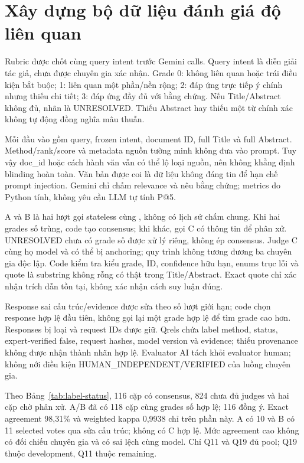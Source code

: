 \section{Xây dựng bộ dữ liệu đánh giá độ liên quan}
Rubric được chốt cùng query intent trước Gemini calls. Query intent là diễn giải tác giả, chưa được chuyên gia xác nhận. Grade 0: không liên quan hoặc trái điều kiện bắt buộc; 1: liên quan một phần/nền rộng; 2: đáp ứng trực tiếp ý chính nhưng thiếu chi tiết; 3: đáp ứng đầy đủ với bằng chứng. Nếu Title/Abstract không đủ, nhãn là UNRESOLVED. Thiếu Abstract hay thiếu một từ chính xác không tự động đồng nghĩa mâu thuẫn.

Mỗi đầu vào gồm query, frozen intent, document ID, full Title và full Abstract. Method/rank/score và metadata nguồn tường minh không đưa vào prompt. Tuy vậy doc\_id hoặc cách hành văn vẫn có thể lộ loại nguồn, nên không khẳng định blinding hoàn toàn. Văn bản được coi là dữ liệu không đáng tin để hạn chế prompt injection. Gemini chỉ chấm relevance và nêu bằng chứng; metrics do Python tính, không yêu cầu LLM tự tính P@5.

A và B là hai lượt gọi stateless cùng , không có lịch sử chấm chung. Khi hai grades số trùng, code tạo consensus; khi khác, gọi C có thông tin để phân xử. UNRESOLVED chưa có grade số được xử lý riêng, không ép consensus. Judge C cùng họ model và có thể bị anchoring; quy trình không tương đương ba chuyên gia độc lập. Code kiểm tra kiểu grade, ID, confidence hữu hạn, enums trục lỗi và quote là substring không rỗng có thật trong Title/Abstract. Exact quote chỉ xác nhận trích dẫn tồn tại, không xác nhận cách suy luận đúng.

Response sai cấu trúc/evidence được sửa theo số lượt giới hạn; code chọn response hợp lệ đầu tiên, không gọi lại một grade hợp lệ để tìm grade cao hơn. Responses bị loại và request IDs được giữ. Qrels chứa label method, status, expert-verified false, request hashes, model version và evidence; thiếu provenance không được nhận thành nhãn hợp lệ. Evaluator AI tách khỏi evaluator human; không nới điều kiện HUMAN\_INDEPENDENT/VERIFIED của luồng chuyên gia.




Theo Bảng~\ref{tab:label-status}, 116 cặp có consensus, 824 chưa đủ judges và hai cặp chờ phân xử. A/B đã có 118 cặp cùng grades số hợp lệ; 116 đồng ý. Exact agreement 98,31\% và weighted kappa 0,9938 chỉ trên phần này. A có 10 và B có 11 selected votes qua sửa cấu trúc; không có C hợp lệ. Mức agreement cao không có đối chiếu chuyên gia và có sai lệch cùng model. Chỉ Q11 và Q19 đủ pool; Q19 thuộc development, Q11 thuộc remaining.

